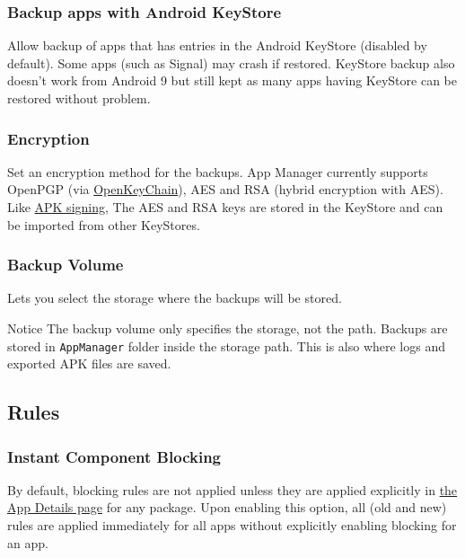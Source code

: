 \subsubsection{Backup apps with Android KeyStore}
Allow backup of apps that has entries in the Android KeyStore (disabled by default).
Some apps (such as Signal) may crash if restored.
KeyStore backup also doesn't work from Android 9 but still kept as many apps having KeyStore can be restored without problem.

\subsubsection{Encryption}\label{subsubsec:settings-encryption}
Set an encryption method for the backups.
App Manager currently supports OpenPGP (via
\href{https://f-droid.org/packages/org.sufficientlysecure.keychain/}{OpenKeyChain}), AES and RSA (hybrid encryption with
AES).
Like \hyperref[subsec:apk-signing]{APK signing}, The AES and RSA keys are stored in the KeyStore and can be imported
from other KeyStores.

\subsubsection{Backup Volume}\label{subsubsec:backup-volume}
Lets you select the storage where the backups will be stored.

\begin{tip}{Notice}
    The backup volume only specifies the storage, not the path.
    Backups are stored in \texttt{AppManager} folder inside the storage path.
    This is also where logs and exported APK files are saved.
\end{tip}

\subsection{Rules}\label{subsec:rules}

\subsubsection{Instant Component Blocking}\label{subsubsec:instant-component-blocking}
By default, blocking rules are not applied unless they are applied explicitly in \hyperref[sec:app-details-page]{the App
Details page} for any package.
Upon enabling this option, all (old and new) rules are applied immediately for all apps without explicitly enabling
blocking for an app.

